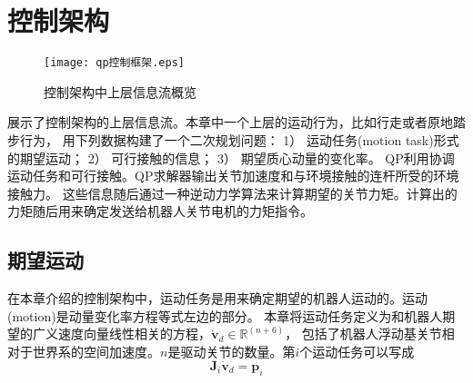 \section{控制架构}
\label{sec:controller}
\begin{figure}[htbp]
    \centering
    \texttt{[image: qp控制框架.eps]}
    \caption{\label{fig:framework_control_flow}控制架构中上层信息流概览}
\end{figure}
展示了控制架构的上层信息流。本章中一个上层的运动行为，比如行走或者原地踏步行为，
用下列数据构建了一个二次规划问题：
1）	运动任务(motion task)形式的期望运动；
2）	可行接触的信息；
3）	期望质心动量的变化率。
QP利用协调运动任务和可行接触。QP求解器输出关节加速度和与环境接触的连杆所受的环境接触力。
这些信息随后通过一种逆动力学算法来计算期望的关节力矩。计算出的力矩随后用来确定发送给机器人关节电机的力矩指令。
\subsection{期望运动}
在本章介绍的控制架构中，运动任务是用来确定期望的机器人运动的。运动(motion)是动量变化率方程等式左边的部分。
本章将运动任务定义为和机器人期望的广义速度向量线性相关的方程，${\dot{\boldsymbol{v}}}_{d}\in {\mathbb{R}}^{(n+6)}$，
包括了机器人浮动基关节相对于世界系的空间加速度。$n$是驱动关节的数量。第$i$个运动任务可以写成
\begin{equation}
    \label{equ:motion_task}
    \boldsymbol{J}_i \dot {\boldsymbol{v}}_d = \boldsymbol{p}_i
\end{equation}
